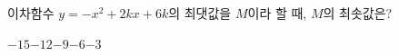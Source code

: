 \hspace*{2mm}\begin{minipage}[t]{\dimexpr\linewidth-2mm\relax}\vspace{0pt}
이차함수 $y=-x^2+2kx+6k$의 최댓값을 $M$이라 할 때, $M$의 최솟값은? 
\begin{choices32}{$-15$}{$-12$}{$-9$}{$-6$}{$-3$}\end{choices32}\end{minipage}
